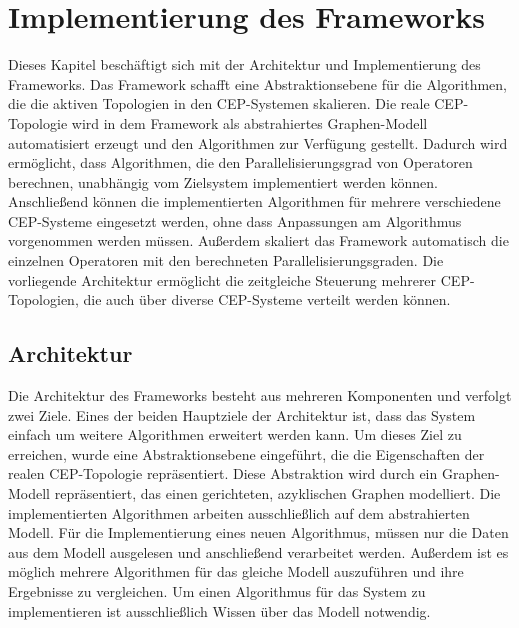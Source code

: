 \chapter{Implementierung des Frameworks}

Dieses Kapitel beschäftigt sich mit der Architektur und Implementierung des Frameworks.
Das Framework schafft eine Abstraktionsebene für die Algorithmen, die die aktiven Topologien in den CEP-Systemen skalieren.
Die reale CEP-Topologie wird in dem Framework als abstrahiertes Graphen-Modell automatisiert erzeugt und den Algorithmen zur Verfügung gestellt.
Dadurch wird ermöglicht, dass Algorithmen, die den Parallelisierungsgrad von Operatoren berechnen, unabhängig vom Zielsystem implementiert werden können.
Anschließend können die implementierten Algorithmen für mehrere verschiedene CEP-Systeme eingesetzt werden, ohne dass Anpassungen am Algorithmus vorgenommen werden müssen.
Außerdem skaliert das Framework automatisch die einzelnen Operatoren mit den berechneten Parallelisierungsgraden.
Die vorliegende Architektur ermöglicht die zeitgleiche Steuerung mehrerer CEP-Topologien, die auch über diverse CEP-Systeme verteilt werden können. 

\section{Architektur}

Die Architektur des Frameworks besteht aus mehreren Komponenten und verfolgt zwei Ziele.
Eines der beiden Hauptziele der Architektur ist, dass das System einfach um weitere Algorithmen erweitert werden kann.
Um dieses Ziel zu erreichen, wurde eine Abstraktionsebene eingeführt, die die Eigenschaften der realen CEP-Topologie repräsentiert.
Diese Abstraktion wird durch ein Graphen-Modell repräsentiert, das einen gerichteten, azyklischen Graphen modelliert.
Die implementierten Algorithmen arbeiten ausschließlich auf dem abstrahierten Modell.
Für die Implementierung eines neuen Algorithmus, müssen nur die Daten aus dem Modell ausgelesen und anschließend verarbeitet werden.
Außerdem ist es möglich mehrere Algorithmen für das gleiche Modell auszuführen und ihre Ergebnisse zu vergleichen.
Um einen Algorithmus für das System zu implementieren ist ausschließlich Wissen über das Modell notwendig.

